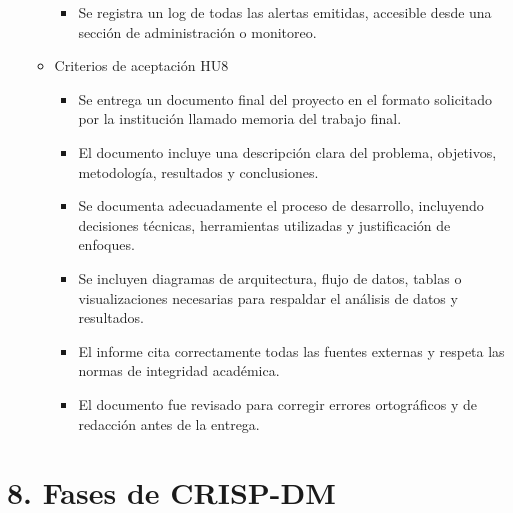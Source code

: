 \documentclass[
11pt, %
]{charter}
\begin{document}
\begin{itemize}
\begin{itemize}
\begin{itemize}
      \item Se registra un log de todas las alertas emitidas, accesible desde una sección de administración o monitoreo.
          \end{itemize}
          
      \item Criterios de aceptación HU8
      
    \begin{itemize}
      \item Se entrega un documento final del proyecto en el formato solicitado por la institución llamado memoria del trabajo final.

      \item El documento incluye una descripción clara del problema, objetivos, metodología, resultados y conclusiones.

      \item Se documenta adecuadamente el proceso de desarrollo, incluyendo decisiones técnicas, herramientas utilizadas y justificación de enfoques.

      \item Se incluyen diagramas de arquitectura, flujo de datos, tablas o visualizaciones necesarias para respaldar el análisis de datos y resultados.

      \item El informe cita correctamente todas las fuentes externas y respeta las normas de integridad académica.

      \item El documento fue revisado para corregir errores ortográficos y de redacción antes de la entrega.
      
    \end{itemize}      
    \end{itemize}
\end{itemize}


\section{8. Fases de CRISP-DM}
\end{document}
